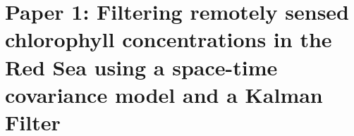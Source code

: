 \chapter{Paper 1: Filtering remotely sensed chlorophyll concentrations in the Red Sea using a space-time covariance model and a Kalman Filter}
\label{appendixB}


